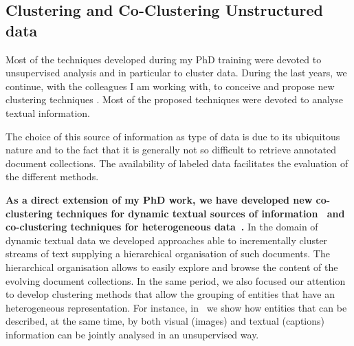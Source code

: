 \subsection{Clustering and Co-Clustering Unstructured data}
Most of the techniques developed during my PhD training were devoted to unsupervised analysis and in particular to cluster data. During the last years, we continue, with the colleagues I am working with, to conceive and propose new clustering techniques . Most of the proposed techniques were devoted to analyse textual information. 

The choice of this source of information as type of data is due to its ubiquitous nature and to the fact that it is generally not so difficult to retrieve annotated document collections. The availability of labeled data facilitates the evaluation of the different methods. 

\textbf{As a direct extension of my PhD work, we have developed new co-clustering techniques for dynamic textual sources of information~\cite{PensaIM14} and co-clustering techniques for heterogeneous data~\cite{IencoRPM13}.}
In the domain of dynamic textual data we developed approaches able to incrementally cluster streams of text supplying a hierarchical organisation of such documents. The hierarchical organisation allows to easily explore and browse the content of the evolving document collections.
In the same period, we also focused our attention to develop clustering methods that allow the grouping of entities that have an heterogeneous representation. For instance, in~\cite{IencoRPM13} we show how entities that can be described, at the same time, by both visual (images) and textual (captions) information can be jointly analysed in an unsupervised way.

